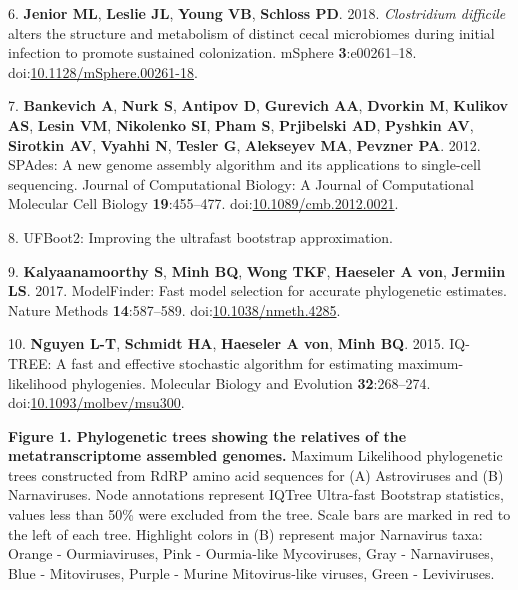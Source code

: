 \documentclass[
  11pt,
]{article}
\begin{document}
\leavevmode\hypertarget{ref-jenior_clostridium_2018}{}%
6. \textbf{Jenior ML}, \textbf{Leslie JL}, \textbf{Young VB},
\textbf{Schloss PD}. 2018. \emph{Clostridium difficile} alters the
structure and metabolism of distinct cecal microbiomes during initial
infection to promote sustained colonization. mSphere
\textbf{3}:e00261--18.
doi:\href{https://doi.org/10.1128/mSphere.00261-18}{10.1128/mSphere.00261-18}.

\leavevmode\hypertarget{ref-bankevich_spades:_2012}{}%
7. \textbf{Bankevich A}, \textbf{Nurk S}, \textbf{Antipov D},
\textbf{Gurevich AA}, \textbf{Dvorkin M}, \textbf{Kulikov AS},
\textbf{Lesin VM}, \textbf{Nikolenko SI}, \textbf{Pham S},
\textbf{Prjibelski AD}, \textbf{Pyshkin AV}, \textbf{Sirotkin AV},
\textbf{Vyahhi N}, \textbf{Tesler G}, \textbf{Alekseyev MA},
\textbf{Pevzner PA}. 2012. SPAdes: A new genome assembly algorithm and
its applications to single-cell sequencing. Journal of Computational
Biology: A Journal of Computational Molecular Cell Biology
\textbf{19}:455--477.
doi:\href{https://doi.org/10.1089/cmb.2012.0021}{10.1089/cmb.2012.0021}.

\leavevmode\hypertarget{ref-hoang_ufboot2:_2018}{}%
8. UFBoot2: Improving the ultrafast bootstrap approximation.

\leavevmode\hypertarget{ref-kalyaanamoorthy_modelfinder:_2017}{}%
9. \textbf{Kalyaanamoorthy S}, \textbf{Minh BQ}, \textbf{Wong TKF},
\textbf{Haeseler A von}, \textbf{Jermiin LS}. 2017. ModelFinder: Fast
model selection for accurate phylogenetic estimates. Nature Methods
\textbf{14}:587--589.
doi:\href{https://doi.org/10.1038/nmeth.4285}{10.1038/nmeth.4285}.

\leavevmode\hypertarget{ref-nguyen_iq-tree:_2015}{}%
10. \textbf{Nguyen L-T}, \textbf{Schmidt HA}, \textbf{Haeseler A von},
\textbf{Minh BQ}. 2015. IQ-TREE: A fast and effective stochastic
algorithm for estimating maximum-likelihood phylogenies. Molecular
Biology and Evolution \textbf{32}:268--274.
doi:\href{https://doi.org/10.1093/molbev/msu300}{10.1093/molbev/msu300}.

\newpage

\textbf{Figure 1. Phylogenetic trees showing the relatives of the
metatranscriptome assembled genomes.} Maximum Likelihood phylogenetic
trees constructed from RdRP amino acid sequences for (A) Astroviruses
and (B) Narnaviruses. Node annotations represent IQTree Ultra-fast
Bootstrap statistics, values less than 50\% were excluded from the tree.
Scale bars are marked in red to the left of each tree. Highlight colors
in (B) represent major Narnavirus taxa: Orange - Ourmiaviruses, Pink -
Ourmia-like Mycoviruses, Gray - Narnaviruses, Blue - Mitoviruses, Purple
- Murine Mitovirus-like viruses, Green - Leviviruses.
\end{document}

